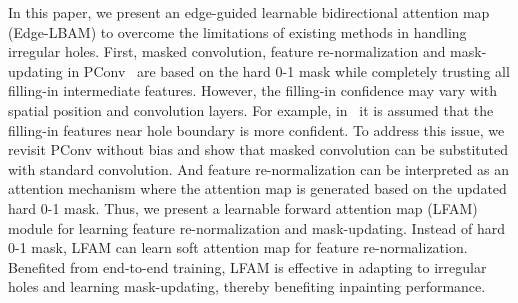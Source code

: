 \documentclass[10pt,journal,compsoc]{IEEEtran}
\begin{document}


In this paper, we present an edge-guided learnable bidirectional attention map (Edge-LBAM) to overcome the limitations of existing methods in handling irregular holes.
%
First, masked convolution, feature re-normalization and mask-updating in PConv~\cite{partialconv2017} are based on the hard 0-1 mask while completely trusting all filling-in intermediate features.
%
However, the filling-in confidence may vary with spatial position and convolution layers.
%
For example, in~\cite{song_contextual_2018} it is assumed that the filling-in features near hole boundary is more confident.
%
To address this issue, we revisit PConv without bias and show that masked convolution can be substituted with standard convolution.
%
And feature re-normalization can be interpreted as an attention mechanism where the attention map is generated based on the updated hard 0-1 mask.
%
Thus, we present a learnable forward attention map (LFAM) module for learning feature re-normalization and mask-updating.
%
Instead of hard 0-1 mask, LFAM can learn soft attention map for feature re-normalization.
%
Benefited from end-to-end training, LFAM is effective in adapting to irregular holes and learning mask-updating, thereby benefiting inpainting performance.
\end{document}
